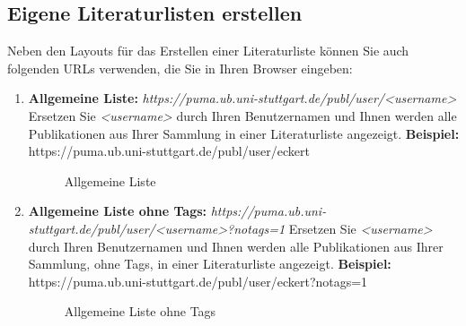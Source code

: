 \subsection{Eigene Literaturlisten erstellen} 
Neben den Layouts für das Erstellen einer Literaturliste können Sie auch folgenden URLs verwenden, die Sie in Ihren Browser eingeben:
\begin{enumerate}%
    \item \textbf{Allgemeine Liste:}\newline
    \textit{https://puma.ub.uni-stuttgart.de/publ/user/<username>} \newline
    Ersetzen Sie \textit{<username>} durch Ihren Benutzernamen und Ihnen werden alle Publikationen aus Ihrer Sammlung in einer Literaturliste angezeigt.\newline
    \textbf{Beispiel:} https://puma.ub.uni-stuttgart.de/publ/user/eckert 
\begin{figure}[h!]
 \centering
 \caption{Allgemeine Liste}
 \label{figure035}
\end{figure}

    \item \textbf{Allgemeine Liste ohne Tags:}\newline
    \textit{https://puma.ub.uni-stuttgart.de/publ/user/<username>?notags=1}\newline
    Ersetzen Sie \textit{<username>} durch Ihren Benutzernamen und Ihnen werden alle Publikationen aus Ihrer Sammlung, ohne Tags, in einer Literaturliste angezeigt.\newline
    \textbf{Beispiel:} https://puma.ub.uni-stuttgart.de/publ/user/eckert?notags=1 
    
\begin{figure}[h!]
 \centering
 \caption{Allgemeine Liste ohne Tags}
 \label{figure036}
\end{figure}


\end{enumerate}
